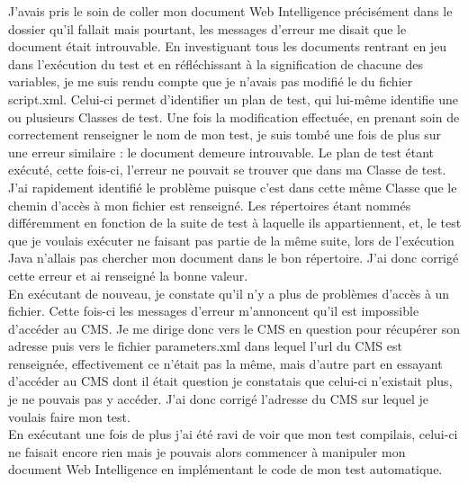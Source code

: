 J'avais pris le soin de coller mon document Web Intelligence pr\'{e}cis\'{e}ment dans le dossier qu'il fallait mais pourtant, les messages d'erreur me disait que le document \'{e}tait introuvable. En investiguant tous les documents rentrant en jeu dans l'ex\'{e}cution du test et en r\'{e}fl\'{e}chissant \`{a} la signification de chacune des variables, je me suis rendu compte que je n'avais pas modifi\'{e} le  du fichier script.xml. Celui-ci permet d'identifier un plan de test, qui lui-m\^{e}me identifie une ou plusieurs \gls{Classe}s de test. Une fois la modification effectu\'{e}e, en prenant soin de correctement renseigner le nom de mon test, je suis tomb\'{e} une fois de plus sur une erreur similaire : le document demeure introuvable. Le plan de test \'{e}tant ex\'{e}cut\'{e}, cette fois-ci, l'erreur ne pouvait se trouver que dans ma \gls{Classe} de test. J'ai rapidement identifi\'{e} le probl\`{e}me puisque c'est dans cette m\^{e}me \gls{Classe} que le chemin d'acc\`{e}s \`{a} mon fichier est renseign\'{e}. Les r\'{e}pertoires \'{e}tant nomm\'{e}s diff\'{e}remment en fonction de la suite de test \`{a} laquelle ils appartiennent, et, le test que je voulais ex\'{e}cuter ne faisant pas partie de la m\^{e}me suite, lors de l'ex\'{e}cution \gls{Java} n'allais pas chercher mon document dans le bon r\'{e}pertoire. J'ai donc corrig\'{e} cette erreur et ai renseign\'{e} la bonne valeur.\\
En ex\'{e}cutant de nouveau, je constate qu'il n'y a plus de probl\`{e}mes d'acc\`{e}s \`{a} un fichier. Cette fois-ci les messages d'erreur m'annoncent qu'il est impossible d'acc\'{e}der au \gls{CMS}. Je me dirige donc vers le \gls{CMS} en question pour r\'{e}cup\'{e}rer son adresse puis vers le fichier parameters.xml dans lequel l'url du \gls{CMS} est renseign\'{e}e, effectivement ce n'\'{e}tait pas la m\^{e}me, mais d'autre part en essayant d'acc\'{e}der au \gls{CMS} dont il \'{e}tait question je constatais que celui-ci n'existait plus, je ne pouvais pas y acc\'{e}der. J'ai donc corrig\'{e} l'adresse du \gls{CMS} sur lequel je voulais faire mon test.\\
En ex\'{e}cutant une fois de plus j'ai \'{e}t\'{e} ravi de voir que mon test compilais, celui-ci ne faisait encore rien mais je pouvais alors commencer \`{a} manipuler mon document Web Intelligence en impl\'{e}mentant le code de mon test automatique.\\

